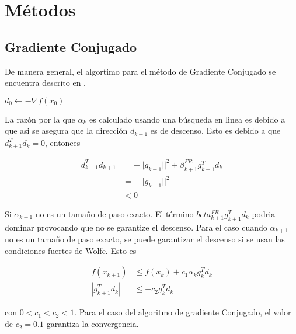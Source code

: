 \section{Métodos}

\subsection{Gradiente Conjugado}

De manera general, el algortimo para el método de Gradiente Conjugado se encuentra descrito en .

\begin{algorithm}[H]
    $d_0 \gets -\nabla f(x_0)$\\
\end{algorithm}

La razón por la que $\alpha_k$ es calculado usando una búsqueda en linea es debido a que asi se asegura que la dirección $d_{k+1}$ es de descenso. Esto es debido a que $d_{k+1}^Td_k=0$, entonces

\begin{align*}
    d_{k+1}^Td_{k+1} & = - ||g_{k+1}||^2+\beta_{k+1}^{FR}g_{k+1}^Td_k \\
                     & = -||g_{k+1}||^2                               \\
                     & <0
\end{align*}

Si $\alpha_{k+1}$ no es un tamaño de paso exacto. El término $beta_{k+1}^{FR}g_{k+1}^Td_k $ podria dominar provocando que no se garantize el descenso. Para el caso cuando $\alpha_{k+1}$ no es un tamaño de paso exacto, se puede garantizar el descenso si se usan las condiciones fuertes de Wolfe. Esto es

\begin{align*}
    f(x_{k+1})     & \leq f(x_{k})+c_1 \alpha_k g_k^Td_k \\
    |g_{k+1}^Td_k| & \leq -c_2g_k^Td_k
\end{align*}

con $0<c_1<c_2<1$. Para el caso del algoritmo de gradiente Conjugado, el valor de $c_2=0.1$ garantiza la convergencia.

